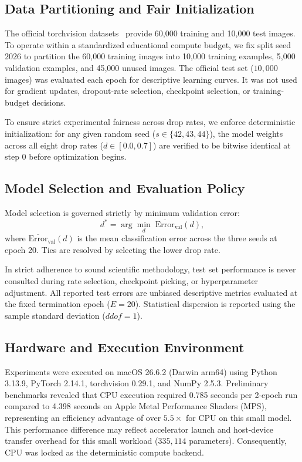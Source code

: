 \documentclass[conference]{IEEEtran}
\begin{document}
\subsection{Data Partitioning and Fair Initialization}
The official torchvision datasets~\cite{torchvision_mnist, torchvision_fashion} provide 60,000 training and 10,000 test images. To operate within a standardized educational compute budget, we fix split seed $2026$ to partition the 60,000 training images into 10,000 training examples, 5,000 validation examples, and 45,000 unused images. The official test set ($10{,}000$ images) was evaluated each epoch for descriptive learning curves. It was not used for gradient updates, dropout-rate selection, checkpoint selection, or training-budget decisions.

To ensure strict experimental fairness across drop rates, we enforce deterministic initialization: for any given random seed ($s \in \{42, 43, 44\}$), the model weights across all eight drop rates ($d \in [0.0, 0.7]$) are verified to be bitwise identical at step 0 before optimization begins.

\subsection{Model Selection and Evaluation Policy}
Model selection is governed strictly by minimum validation error:
\begin{equation}
d^* = \arg\min_{d} \; \overline{\text{Error}}_{\text{val}}(d),
\end{equation}
where $\overline{\text{Error}}_{\text{val}}(d)$ is the mean classification error across the three seeds at epoch 20. Ties are resolved by selecting the lower drop rate. 

In strict adherence to sound scientific methodology, test set performance is never consulted during rate selection, checkpoint picking, or hyperparameter adjustment. All reported test errors are unbiased descriptive metrics evaluated at the fixed termination epoch ($E=20$). Statistical dispersion is reported using the sample standard deviation ($ddof=1$).

\subsection{Hardware and Execution Environment}
Experiments were executed on macOS 26.6.2 (Darwin arm64) using Python 3.13.9, PyTorch 2.14.1, torchvision 0.29.1, and NumPy 2.5.3. Preliminary benchmarks revealed that CPU execution required 0.785 seconds per 2-epoch run compared to 4.398 seconds on Apple Metal Performance Shaders (MPS), representing an efficiency advantage of over $5.5\times$ for CPU on this small model. This performance difference may reflect accelerator launch and host-device transfer overhead for this small workload ($335{,}114$ parameters). Consequently, CPU was locked as the deterministic compute backend.
\end{document}
